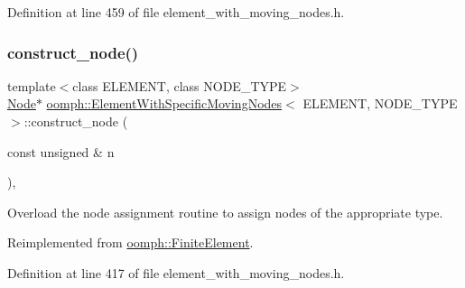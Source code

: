 Definition at line 459 of file element\+\_\+with\+\_\+moving\+\_\+nodes.\+h.

\mbox{\label{classoomph_1_1ElementWithSpecificMovingNodes_a30518ed83666fd5d68380f9a91261a8f}} 
\subsubsection{\texorpdfstring{construct\+\_\+node()}{construct\_node()}\hspace{0.1cm}{\footnotesize\ttfamily [1/2]}}
{\footnotesize\ttfamily template$<$class E\+L\+E\+M\+E\+NT, class N\+O\+D\+E\+\_\+\+T\+Y\+PE$>$ \\
\hyperlink{classoomph_1_1Node}{Node}$\ast$ \hyperlink{classoomph_1_1ElementWithSpecificMovingNodes}{oomph\+::\+Element\+With\+Specific\+Moving\+Nodes}$<$ E\+L\+E\+M\+E\+NT, N\+O\+D\+E\+\_\+\+T\+Y\+PE $>$\+::construct\+\_\+node (\begin{DoxyParamCaption}\item[{const unsigned \&}]{n }\end{DoxyParamCaption})\hspace{0.3cm}{\ttfamily [inline]}, {\ttfamily [virtual]}}



Overload the node assignment routine to assign nodes of the appropriate type. 



Reimplemented from \hyperlink{classoomph_1_1FiniteElement_a22ff82b3c3a2c0f204090fcb31bea1f5}{oomph\+::\+Finite\+Element}.



Definition at line 417 of file element\+\_\+with\+\_\+moving\+\_\+nodes.\+h.

\mbox{\label{classoomph_1_1ElementWithSpecificMovingNodes_aee8cdb8c967eb73fc0443c5812e41ceb}} 
